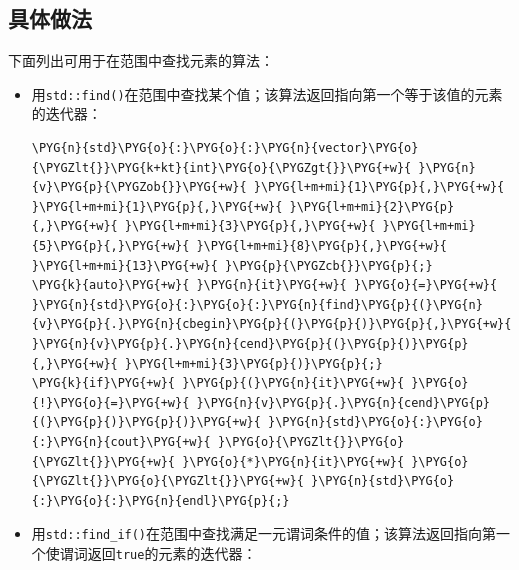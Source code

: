 
\subsection{具体做法}



下面列出可用于在范围中查找元素的算法：



\begin{itemize}
\item 用\texttt{std::\allowbreak{}find()}在范围中查找某个值；该算法返回指向第一个等于该值的元素的迭代器：



\begin{codeblockbg}
\begin{Verbatim}[commandchars=\\\{\},breaklines=true,breakanywhere=true,fontsize=\codefont,xleftmargin=17bp]
\PYG{n}{std}\PYG{o}{:}\PYG{o}{:}\PYG{n}{vector}\PYG{o}{\PYGZlt{}}\PYG{k+kt}{int}\PYG{o}{\PYGZgt{}}\PYG{+w}{ }\PYG{n}{v}\PYG{p}{\PYGZob{}}\PYG{+w}{ }\PYG{l+m+mi}{1}\PYG{p}{,}\PYG{+w}{ }\PYG{l+m+mi}{1}\PYG{p}{,}\PYG{+w}{ }\PYG{l+m+mi}{2}\PYG{p}{,}\PYG{+w}{ }\PYG{l+m+mi}{3}\PYG{p}{,}\PYG{+w}{ }\PYG{l+m+mi}{5}\PYG{p}{,}\PYG{+w}{ }\PYG{l+m+mi}{8}\PYG{p}{,}\PYG{+w}{ }\PYG{l+m+mi}{13}\PYG{+w}{ }\PYG{p}{\PYGZcb{}}\PYG{p}{;}
\PYG{k}{auto}\PYG{+w}{ }\PYG{n}{it}\PYG{+w}{ }\PYG{o}{=}\PYG{+w}{ }\PYG{n}{std}\PYG{o}{:}\PYG{o}{:}\PYG{n}{find}\PYG{p}{(}\PYG{n}{v}\PYG{p}{.}\PYG{n}{cbegin}\PYG{p}{(}\PYG{p}{)}\PYG{p}{,}\PYG{+w}{ }\PYG{n}{v}\PYG{p}{.}\PYG{n}{cend}\PYG{p}{(}\PYG{p}{)}\PYG{p}{,}\PYG{+w}{ }\PYG{l+m+mi}{3}\PYG{p}{)}\PYG{p}{;}
\PYG{k}{if}\PYG{+w}{ }\PYG{p}{(}\PYG{n}{it}\PYG{+w}{ }\PYG{o}{!}\PYG{o}{=}\PYG{+w}{ }\PYG{n}{v}\PYG{p}{.}\PYG{n}{cend}\PYG{p}{(}\PYG{p}{)}\PYG{p}{)}\PYG{+w}{ }\PYG{n}{std}\PYG{o}{:}\PYG{o}{:}\PYG{n}{cout}\PYG{+w}{ }\PYG{o}{\PYGZlt{}}\PYG{o}{\PYGZlt{}}\PYG{+w}{ }\PYG{o}{*}\PYG{n}{it}\PYG{+w}{ }\PYG{o}{\PYGZlt{}}\PYG{o}{\PYGZlt{}}\PYG{+w}{ }\PYG{n}{std}\PYG{o}{:}\PYG{o}{:}\PYG{n}{endl}\PYG{p}{;}
\end{Verbatim}
\end{codeblockbg}



\item 用\texttt{std::\allowbreak{}find\_\allowbreak{}if()}在范围中查找满足一元谓词条件的值；该算法返回指向第一个使谓词返回\texttt{true}的元素的迭代器：




\end{itemize}
